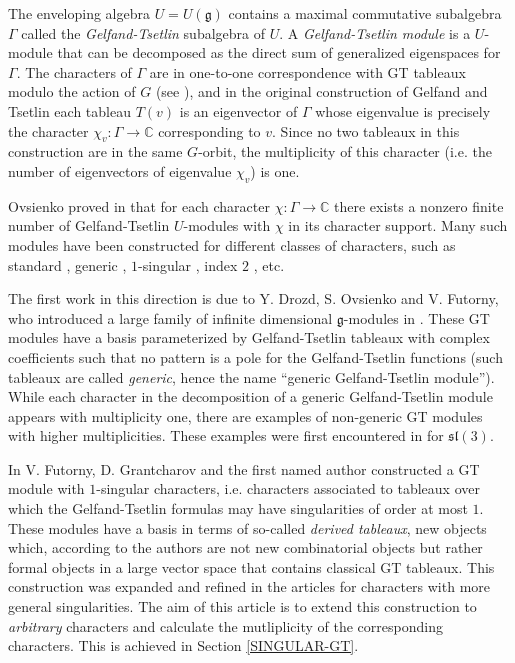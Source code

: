 \documentclass[11pt,fleqn]{article}
\newcommand\CC{\mathbb C}
\renewcommand\to{\longrightarrow}
\newcommand\g{\mathfrak g}
\begin{document}
The enveloping algebra $U = U(\g)$ contains a maximal commutative subalgebra 
$\Gamma$ called the \emph{Gelfand-Tsetlin} subalgebra 
of $U$. A \emph{Gelfand-Tsetlin module} is a $U$-module that can be
decomposed as the direct sum of generalized eigenspaces for $\Gamma$.
The characters of $\Gamma$ are in one-to-one correspondence with GT tableaux 
modulo the action of $G$ (see \cite{Zh-compact-book}), and in the original 
construction of Gelfand and Tsetlin each tableau $T(v)$ is an eigenvector of 
$\Gamma$ whose eigenvalue is precisely the character $\chi_v: \Gamma \to \CC$ 
corresponding to $v$. Since no two tableaux in this construction are in the 
same $G$-orbit, the multiplicity of this character (i.e. the number of 
eigenvectors of eigenvalue $\chi_v$) is one.

Ovsienko proved in \cites{Ovs-finiteness, Ovs-strongly-nilpotent} that for 
each character $\chi: \Gamma \to \CC$ there exists a nonzero finite number of 
Gelfand-Tsetlin $U$-modules with $\chi$ in its character support. Many such 
modules have been constructed for different classes of characters, such as 
standard \cite{GT-modules}, generic \cite{DFO-GT-modules}, $1$-singular 
\cite{FGR-1-singular}, index $2$ \cite{FGR-2-index}, etc.  

The first work in this direction is due to Y. Drozd, S. Ovsienko and V. 
Futorny, who introduced a large family of infinite dimensional $\g$-modules 
in \cite{DFO-GT-modules}. These GT modules have a basis parameterized by 
Gelfand-Tsetlin tableaux with complex coefficients such that no pattern is a 
pole for the Gelfand-Tsetlin functions (such tableaux 
are called \emph{generic}, hence the name ``generic Gelfand-Tsetlin module''). 
While each character in the decomposition of a generic Gelfand-Tsetlin module
appears with multiplicity one, there are examples of non-generic GT modules
with higher multiplicities. These examples were first encountered in 
\cites{Fut-generalization-Verma, Fut-semiprimitive} for $\mathfrak{sl}(3)$.

In \cite{FGR-1-singular} V. Futorny, D. Grantcharov and the first named author
constructed a GT module with $1$-singular characters, i.e. characters 
associated to tableaux over which the Gelfand-Tsetlin formulas may have 
singularities of order at most $1$. These modules have a basis in terms of 
so-called \emph{derived tableaux}, new objects which, according to the authors 
are not new combinatorial objects but rather formal objects in a large
vector space that contains classical GT tableaux. This construction was 
expanded and refined in the articles \cites{FGR-2-index, Zad-1-sing, 
V-geometric-1-singular-GT} for characters with more general singularities. The 
aim of this article is to extend this construction to \emph{arbitrary} 
characters and calculate the mutliplicity of the corresponding characters. 
This is achieved in Section \ref{SINGULAR-GT}. 
\end{document}
